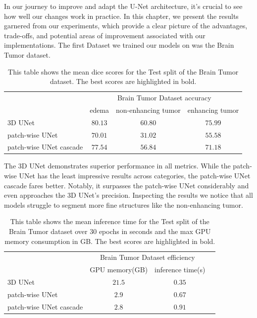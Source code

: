 In our journey to improve and adapt the U-Net architecture, it's crucial to see how well our changes work in practice. In this chapter,
we present the results garnered from our experiments, which provide a clear picture of the advantages, trade-offs, and potential areas of improvement associated with our implementations.
The first Dataset we trained our models on was the Brain Tumor dataset.

\begin{table}[ht!]
\begin{center} {\footnotesize
\begin{tabular}{lccc}
\hline
	& \multicolumn{3}{c}{Brain Tumor Dataset accuracy} \\
	& \multicolumn{1}{c}{edema} & \multicolumn{1}{c}{non-enhancing tumor} & \multicolumn{1}{c}{enhancing tumor}\\
\hline
3D UNet & $\mathbf{80.13}$ & $\mathbf{60.80}$ & $\mathbf{75.99}$ \\[1ex]
patch-wise UNet & $70.01$ & $31.02$ & $55.58$ \\[1ex]
patch-wise UNet cascade & $77.54$ & $56.84$ & $71.18$ \\[1ex]
\hline
\end{tabular} }
\end{center}
\caption{\footnotesize This table shows the mean dice scores for the Test split of the Brain Tumor dataset. The best scores are highlighted in bold.}
\label{turns}
\end{table}

\noindent The 3D UNet demonstrates superior performance in all metrics. While the patch-wise UNet has the least impressive results across categories,
the patch-wise UNet cascade fares better. Notably, it surpasses the patch-wise UNet considerably and even approaches the 3D UNet's precision.
Inspecting the results we notice that all models struggle to segment more fine structures like the non-enhancing tumor.\\

\begin{table}[ht!]
\begin{center} {\footnotesize
\begin{tabular}{lccc}
\hline
	& \multicolumn{2}{c}{Brain Tumor Dataset efficiency} \\
	& \multicolumn{1}{c}{GPU memory(GB)} & \multicolumn{1}{c}{inference time(s)} \\
\hline
3D UNet & $21.5$ & $\mathbf{0.35}$ \\[1ex]
patch-wise UNet & $2.9$ & $0.67$ \\[1ex]
patch-wise UNet cascade & $\mathbf{2.8}$ & $0.91$\\[1ex]
\hline
\end{tabular} }
\end{center}
\caption{\footnotesize This table shows the mean inference time for the Test split of the Brain Tumor dataset over 30 epochs in seconds and the max GPU memory consumption in GB.
The best scores are highlighted in bold.}
\label{turns}
\end{table}

